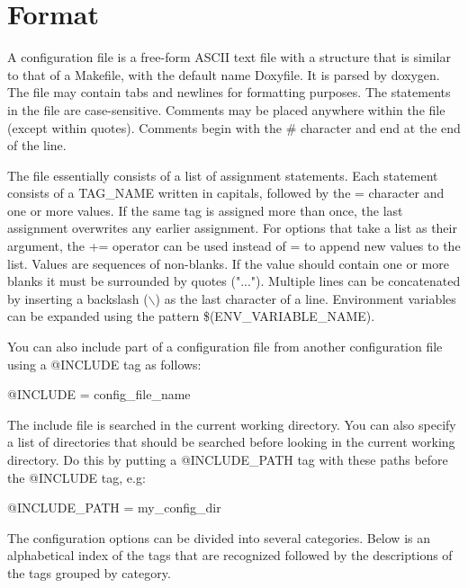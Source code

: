 \hypertarget{config_config_format}{}\section{Format}\label{config_config_format}
A configuration file is a free-\/form ASCII text file with a structure that is similar to that of a Makefile, with the default name {\ttfamily Doxyfile}. It is parsed by {\ttfamily doxygen}. The file may contain tabs and newlines for formatting purposes. The statements in the file are case-\/sensitive. Comments may be placed anywhere within the file (except within quotes). Comments begin with the \# character and end at the end of the line.

The file essentially consists of a list of assignment statements. Each statement consists of a {\ttfamily TAG\_\-NAME} written in capitals, followed by the {\ttfamily =} character and one or more values. If the same tag is assigned more than once, the last assignment overwrites any earlier assignment. For options that take a list as their argument, the {\ttfamily +=} operator can be used instead of {\ttfamily =} to append new values to the list. Values are sequences of non-\/blanks. If the value should contain one or more blanks it must be surrounded by quotes ("..."). Multiple lines can be concatenated by inserting a backslash ($\backslash$) as the last character of a line. Environment variables can be expanded using the pattern {\ttfamily \$(ENV\_\-VARIABLE\_\-NAME)}.

You can also include part of a configuration file from another configuration file using a {\ttfamily @INCLUDE} tag as follows: \begin{DoxyVerb}
@INCLUDE = config_file_name
\end{DoxyVerb}
 The include file is searched in the current working directory. You can also specify a list of directories that should be searched before looking in the current working directory. Do this by putting a {\ttfamily @INCLUDE\_\-PATH} tag with these paths before the {\ttfamily @INCLUDE} tag, e.g: \begin{DoxyVerb}
@INCLUDE_PATH = my_config_dir
\end{DoxyVerb}


The configuration options can be divided into several categories. Below is an alphabetical index of the tags that are recognized followed by the descriptions of the tags grouped by category.

